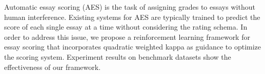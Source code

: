 Automatic essay scoring (AES) is the task of assigning grades to essays without human interference. Existing systems for AES are typically trained to predict the score of each single essay at a time without considering the rating schema. In order to address this issue, we propose a reinforcement learning framework for essay scoring that incorporates quadratic weighted kappa as guidance to optimize the scoring system. Experiment results on benchmark datasets show the effectiveness of our framework.
